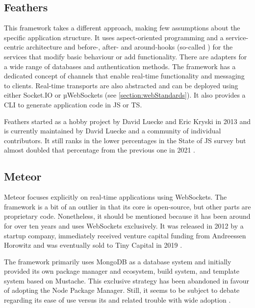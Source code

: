 \subsection{Feathers}

This framework takes a different approach, making few assumptions about the specific application structure. It uses aspect-oriented programming and a service-centric architecture and before-, after- and around-hooks (so-called ) for the services that modify basic behaviour or add functionality. There are adapters for a wide range of databases and authentication methods. The framework has a dedicated concept of channels that enable real-time functionality and messaging to clients. Real-time transports are also abstracted and can be deployed using either Socket.IO or µWebSockets (see \autoref{section:webStandards}). It also provides a \ac{CLI} to generate application code in \ac{JS} or \ac{TS}.

Feathers started as a hobby project by David Luecke and Eric Kryski in 2013 \parencite{feathersFrameworkHistory} and is currently maintained by David Luecke and a community of individual contributors. It still ranks in the lower percentages in the State of JS survey but almost doubled that percentage from the previous one in 2021 \parencite{mostUsedBackendFrameworks21}.

\subsection{Meteor}

Meteor focuses explicitly on real-time applications using WebSockets. The framework is a bit of an outlier in that its core is open-source, but other parts are proprietary code. Nonetheless, it should be mentioned because it has been around for over ten years and uses WebSockets exclusively. It was released in 2012 by a startup company, immediately received venture capital funding from Andreessen Horowitz and was eventually sold to Tiny Capital in 2019 \parencite{meteorSaleTinyCapital}.

The framework primarily uses MongoDB as a database system and initially provided its own package manager and ecosystem, build system, and template system based on Mustache. This exclusive strategy has been abandoned in favour of adopting the Node Package Manager. Still, it seems to be subject to debate regarding its ease of use versus its  and related trouble with wide adoption \parencite{meteorDiscussionYCombinator}.


